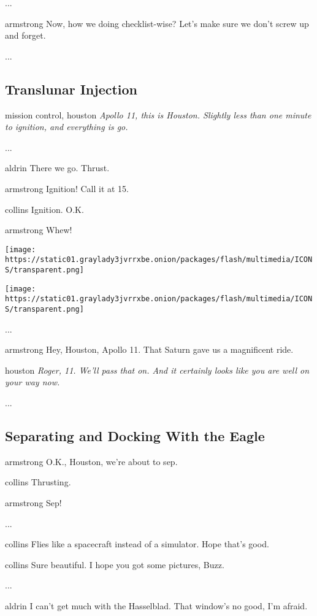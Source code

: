 ...

armstrong Now, how we doing checklist-wise? Let's make sure we don't
screw up and forget.

...

\hypertarget{-translunar-injection-}{%
\subsection{ Translunar Injection }\label{-translunar-injection-}}

mission control, houston \emph{Apollo 11, this is Houston. Slightly less
than one minute to ignition, and everything is go.}

...

aldrin There we go. Thrust.

armstrong Ignition! Call it at 15.

collins Ignition. O.K.

armstrong Whew!

\texttt{[image: https://static01.graylady3jvrrxbe.onion/packages/flash/multimedia/ICONS/transparent.png]}

\texttt{[image: https://static01.graylady3jvrrxbe.onion/packages/flash/multimedia/ICONS/transparent.png]}

...

armstrong Hey, Houston, Apollo 11. That Saturn gave us a magnificent
ride.

houston \emph{Roger, 11. We'll pass that on. And it certainly looks like
you are well on your way now.}

...

\hypertarget{-separating-and-docking-with-the-eagle-}{%
\subsection{ Separating and Docking With the Eagle
}\label{-separating-and-docking-with-the-eagle-}}

armstrong O.K., Houston, we're about to sep.

collins Thrusting.

armstrong Sep!

...

collins Flies like a spacecraft instead of a simulator. Hope that's
good.

collins Sure beautiful. I hope you got some pictures, Buzz.

...

aldrin I can't get much with the Hasselblad. That window's no good, I'm
afraid.


